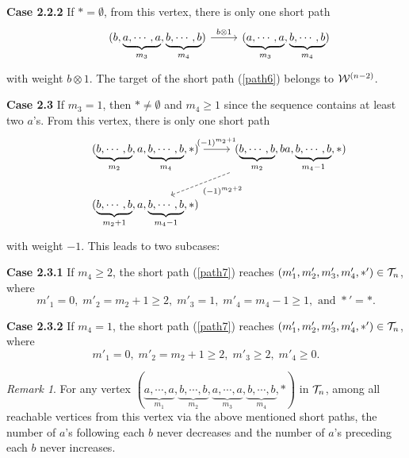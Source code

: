 \documentclass[10pt, reqno]{amsart}
\theoremstyle{definition}
\theoremstyle{remark}
\newtheorem{remark}[theorem]{Remark}
\numberwithin{equation}{section}
\begin{document}
\noindent \hspace*{4em}\textbf{Case 2.2.2} If \(*=\emptyset\), from this vertex, there is only one short path 
\begin{equation} \label{path6}
    \begin{tikzcd}
   & (b, \underbrace{a, \cdots,a}_{m_3},  \underbrace{b, \cdots,b}_{m_4}) \arrow[r,"b \otimes 1"] & (\underbrace{a, \cdots,a}_{m_3}, \underbrace{b, \cdots,b}_{m_4}) 
        \end{tikzcd}
\end{equation}
with weight $b \otimes 1$. The target of the short path (\ref{path6}) belongs to  \(\mathcal{W}^{(n-2)}\).

\noindent \hspace*{2em}\textbf{Case 2.3} If \(m_3=1\), then \(*\neq \emptyset\) and \(m_4 \ge 1\) since the sequence contains at least two \(a\)'s. From this vertex, there is only one short path
\begin{equation} \label{path7}
    \begin{tikzcd}
   & (\underbrace{b, \cdots,b}_{m_2}, a,  \underbrace{b, \cdots,b}_{m_4}, *) \arrow[r,"(-1)^{m_2+1}"] & (\underbrace{b, \cdots,b}_{m_2}, ba, \underbrace{b, \cdots,b}_{m_4-1}, *) \arrow[ld,dashed,"(-1)^{m_2+2}"]\\
   & (\underbrace{b, \cdots,b}_{m_2+1}, a, \underbrace{b, \cdots,b}_{m_4-1}, *)
        \end{tikzcd}
\end{equation}
with weight $-1$. This leads to two subcases:

\noindent \hspace*{4em}\textbf{Case 2.3.1} If \(m_4 \ge 2\), the short path (\ref{path7}) reaches \((m'_1, m'_2, m'_3, m'_4, *')\in \mathcal{T}_n\), where
\begin{equation}
    m'_1=0,\; m'_2=m_2+1 \ge 2,\; m'_3=1,\; m'_4=m_4-1 \ge 1, \text{ and } *'=*.
\end{equation}


\noindent \hspace*{4em}\textbf{Case 2.3.2} If \(m_4 =1\), the short path (\ref{path7}) reaches \((m'_1, m'_2, m'_3, m'_4, *')\in \mathcal{T}_n\), where
\begin{equation}
    m'_1=0,\; m'_2=m_2+1 \ge 2,\; m'_3\ge 2,\; m'_4\ge 0.
\end{equation}

\begin{remark}\label{rem: all used short path}
    For any vertex \((\underbrace{a, \cdots,a}_{m_1}, \underbrace{b, \cdots,b}_{m_2}, \underbrace{a, \cdots,a}_{m_3}, \underbrace{b, \cdots,b}_{m_4},*)\) in \(\mathcal{T}_n\), among all reachable vertices from this vertex via the above mentioned short paths,  the number of \(a\)'s following each \(b\) never decreases and the number of \(a\)'s preceding each \(b\) never increases.
\end{remark}
\end{document}
